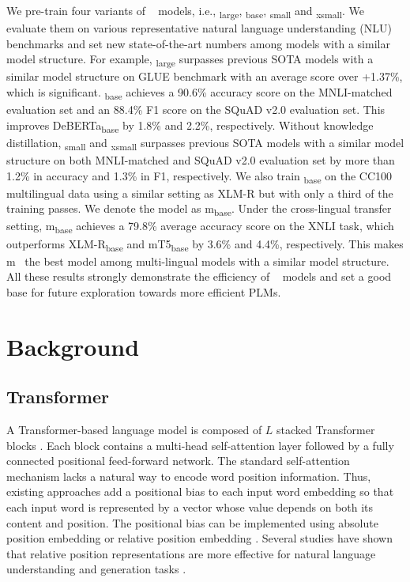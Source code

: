 We pre-train four variants of \ModelName~ models, i.e., \ModelName\textsubscript{large}, \ModelName\textsubscript{base}, \ModelName\textsubscript{small} and \ModelName\textsubscript{xsmall}. 
We evaluate them on various representative natural language understanding (NLU) benchmarks and set new state-of-the-art numbers among models with a similar model structure. For example, \ModelName\textsubscript{large} surpasses previous SOTA models with a similar model structure on GLUE \citep{wang2018glue} benchmark with an average score over +1.37\%, which is significant. 
\ModelName\textsubscript{base} achieves a 90.6\% accuracy score on the MNLI-matched \citep{mnli2018} evaluation set and an 88.4\% F1 score on the SQuAD v2.0 \citep{squad2} evaluation set. This improves DeBERTa\textsubscript{base} by 1.8\% and 2.2\%, respectively. Without knowledge distillation, \ModelName\textsubscript{small} and \ModelName\textsubscript{xsmall} surpasses previous SOTA models with a similar model structure on both MNLI-matched and SQuAD v2.0 evaluation set by more than 1.2\% in accuracy and 1.3\% in F1, respectively. We also train \ModelName\textsubscript{base} on the CC100 \citep{conneau2020xlmr} multilingual data using a similar setting as XLM-R \citep{conneau2020xlmr} but with only a third of the training passes. We denote the model as m\ModelName\textsubscript{base}. Under the cross-lingual transfer setting, m\ModelName\textsubscript{base} achieves a 79.8\% average accuracy score on the XNLI \citep{conneau2018xnli} task, which outperforms XLM-R\textsubscript{base}  and mT5\textsubscript{base} \citep{xue2021mt5} by 3.6\% and 4.4\%, respectively. This makes m\ModelName~ the best model among multi-lingual models with a similar model structure. All these results strongly demonstrate the efficiency of \ModelName~ models and set a good base for future exploration towards more efficient PLMs.

\section{Background}
\subsection{Transformer}
A Transformer-based language model is composed of $L$ stacked Transformer blocks \citep{vaswani2017attention}. Each block contains a multi-head self-attention layer followed by a fully connected positional feed-forward network. The standard self-attention mechanism lacks a natural way to encode word position information. Thus, existing approaches add  a positional bias to each input word embedding so that each input word is represented by a vector whose value depends on both its content and position. The positional bias can be implemented using absolute position embedding \citep{vaswani2017attention,gpt3,devlin2018bert} or relative position embedding \citep{huang2018music,yang2019xlnet}. Several studies have shown that relative position representations are more effective for natural language understanding and generation tasks \citep{dai2019transformer,shaw2018self,he2020deberta}.

